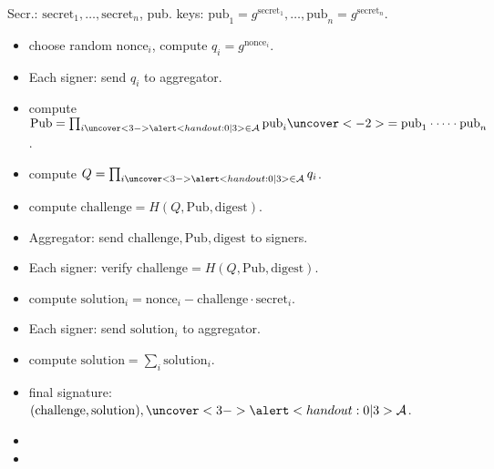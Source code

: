 \begin{frame}
Secr.: $\mathrm{secret}_1, \dots, \mathrm{secret}_n$, pub. keys: $\mathrm{pub}_1 = g^{ \mathrm{secret }_1 }, \dots, \mathrm{pub}_n= g^{\mathrm{secret}_n}$.

\begin{emptyTheorem}
\begin{itemize}
\item {} choose random $\mathrm{nonce}_i$, compute $q_i = g^{\mathrm{nonce}_i}$.
\item<2-> Each signer: send $q_i$ to aggregator.  
\item {} compute $ \mathrm{Pub} =\prod_{i \uncover<3->{ \alertNoH{3}{\in \mathcal A} }} \mathrm{pub}_i \uncover<-2>{=\mathrm{pub}_1\cdot \dots \cdot \mathrm{pub}_n}$. 
\item {} compute $ Q = \prod_{i \uncover<3->{ \alertNoH{3}{\in \mathcal A} }} q_i$.
\item {} compute  $\mathrm{challenge} = H(Q, \mathrm{Pub}, \mathrm{digest})$.
\item<2-> Aggregator: send $\mathrm{challenge},\mathrm{Pub}, \mathrm{digest}$ to signers. 
\item<2-> Each signer: verify $\mathrm{challenge} = H(Q, \mathrm {Pub}, \mathrm{digest}) $.
\item {} compute $\mathrm{solution}_i = {\mathrm{nonce}_i - \mathrm{challenge} \cdot \mathrm{secret}_i} $.
\item<2-> Each signer: send $\mathrm{solution}_i$ to aggregator. 
\item {} compute $\mathrm{solution} = \sum_i \mathrm{solution}_i $.
\item {} final signature: $(\mathrm{challenge}, \mathrm{solution}), \uncover<3->{\alertNoH{3}{\mathcal A}}$.
\end{itemize}
\end{emptyTheorem}
\vskip -0.15cm
\begin{itemize}
\item {}
\item {}
\end{itemize}
\vskip 15cm
\end{frame}

